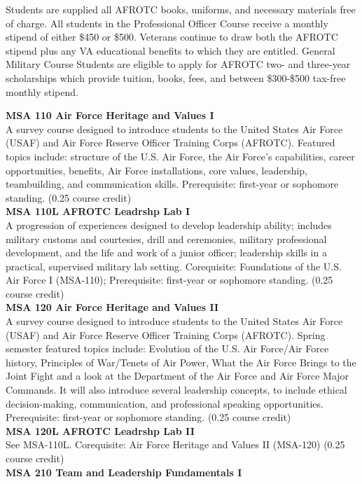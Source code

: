 \documentclass[
  letterpaper,
]{scrbook}
\begin{document}
Students are supplied all AFROTC books, uniforms, and necessary
materials free of charge. All students in the Professional Officer
Course receive a monthly stipend of either \$450 or \$500. Veterans
continue to draw both the AFROTC stipend plus any VA educational
benefits to which they are entitled. General Military Course Students
are eligible to apply for AFROTC two- and three-year scholarships which
provide tuition, books, fees, and between \$300-\$500 tax-free monthly
stipend.

\textbf{MSA 110 Air Force Heritage and Values I}\\
A survey course designed to introduce students to the United States Air
Force (USAF) and Air Force Reserve Officer Training Corps (AFROTC).
Featured topics include: structure of the U.S. Air Force, the Air
Force's capabilities, career opportunities, benefits, Air Force
installations, core values, leadership, teambuilding, and communication
skills. Prerequisite: first-year or sophomore standing. (0.25 course
credit)\\
\textbf{MSA 110L AFROTC Leadrshp Lab I}\\
A progression of experiences designed to develop leadership ability;
includes military customs and courtesies, drill and ceremonies, military
professional development, and the life and work of a junior officer;
leadership skills in a practical, supervised military lab setting.
Corequisite: Foundations of the U.S. Air Force I (MSA-110);
Prerequisite: first-year or sophomore standing. (0.25 course credit)\\
\textbf{MSA 120 Air Force Heritage and Values II}\\
A survey course designed to introduce students to the United States Air
Force (USAF) and Air Force Reserve Officer Training Corps (AFROTC).
Spring semester featured topics include: Evolution of the U.S. Air
Force/Air Force history, Principles of War/Tenets of Air Power, What the
Air Force Brings to the Joint Fight and a look at the Department of the
Air Force and Air Force Major Commands. It will also introduce several
leadership concepts, to include ethical decision-making, communication,
and professional speaking opportunities. Prerequisite: first-year or
sophomore standing. (0.25 course credit)\\
\textbf{MSA 120L AFROTC Leadrshp Lab II}\\
See MSA-110L. Corequisite: Air Force Heritage and Values II (MSA-120)
(0.25 course credit)\\
\textbf{MSA 210 Team and Leadership Fundamentals I}\\
\end{document}
